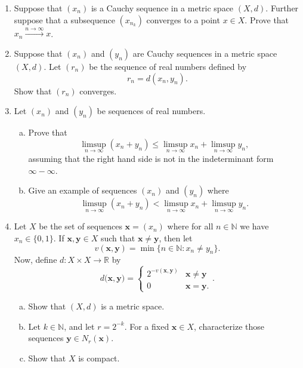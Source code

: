 \documentclass{amsart}
\begin{document}
\begin{enumerate}[1.]
\newpage
\item Suppose that $(x_n)$ is a Cauchy sequence in a metric space $(X,d)$. Further suppose that a subsequence $(x_{n_k})$ converges to a point $x \in X$. Prove that $x_n \xrightarrow{n \to \infty} x$.
\newpage
\item Suppose that $(x_n)$ and $(y_n)$ are Cauchy sequences in a metric space $(X,d)$. Let $(r_n)$ be the sequence of real numbers defined by
\[ r_n = d(x_n, y_n). \]
Show that $(r_n)$ converges.
\newpage
\item Let $(x_n)$ and $(y_n)$ be sequences of real numbers.
\begin{enumerate}[(a)]
\item Prove that 
\[ \limsup_{n \to \infty} (x_n+y_n) \leq \limsup_{n \to \infty} x_n + \limsup_{n \to \infty} y_n, \]
assuming that the right hand side is not in the indeterminant form $\infty-\infty$.
\item Give an example of sequences $(x_n)$ and $(y_n)$ where
\[ \limsup_{n \to \infty} (x_n+y_n) < \limsup_{n \to \infty} x_n + \limsup_{n \to \infty} y_n.\]
\end{enumerate}
\newpage
\item  Let $X$ be the set of sequences $\mathbf{x} = (x_n)$ where for all $n \in \mathbb{N}$ we have $x_n \in \{0,1\}$. If $\mathbf{x},\mathbf{y} \in X$ such that $\mathbf{x} \neq \mathbf{y}$, then let
\[ v(\mathbf{x},\mathbf{y}) = \min\{ n \in \mathbb{N}: x_n \neq y_n \}.\]
Now, define $d: X \times X \to \mathbb{R}$ by
\[ d\big( \mathbf{x},\mathbf{y} \big) = \begin{cases} 2^{-v( \mathbf{x},\mathbf{y} )} & \mathbf{x} \neq \mathbf{y} \\ 0 & \mathbf{x}=\mathbf{y}.\end{cases}.\]
\begin{enumerate}[(a)]
\item Show that $(X,d)$ is a metric space.
\item Let $k \in \mathbb{N}$, and let $r=2^{-k}$. For a fixed $\mathbf{x} \in X$, characterize those sequences $\mathbf{y} \in N_{r}(\mathbf{x})$.
\item Show that $X$ is compact.
\end{enumerate}
\end{enumerate}
\end{document}
